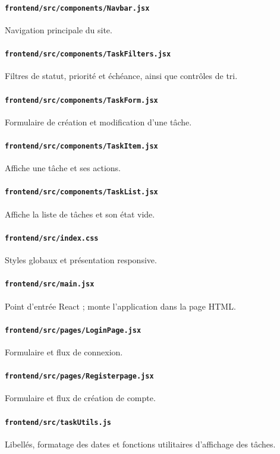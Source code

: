 \documentclass[10pt,a4paper]{article}
\begin{document}
\paragraph{\texttt{frontend/src/components/Navbar.jsx}} Navigation principale du site.
\paragraph{\texttt{frontend/src/components/TaskFilters.jsx}} Filtres de statut, priorité et échéance, ainsi que contrôles de tri.
\paragraph{\texttt{frontend/src/components/TaskForm.jsx}} Formulaire de création et modification d'une tâche.
\paragraph{\texttt{frontend/src/components/TaskItem.jsx}} Affiche une tâche et ses actions.
\paragraph{\texttt{frontend/src/components/TaskList.jsx}} Affiche la liste de tâches et son état vide.
\paragraph{\texttt{frontend/src/index.css}} Styles globaux et présentation responsive.
\paragraph{\texttt{frontend/src/main.jsx}} Point d'entrée React ; monte l'application dans la page HTML.
\paragraph{\texttt{frontend/src/pages/LoginPage.jsx}} Formulaire et flux de connexion.
\paragraph{\texttt{frontend/src/pages/Registerpage.jsx}} Formulaire et flux de création de compte.
\paragraph{\texttt{frontend/src/taskUtils.js}} Libellés, formatage des dates et fonctions utilitaires d'affichage des tâches.
\end{document}
